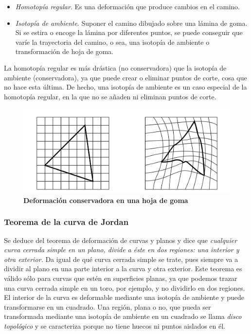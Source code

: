 \begin{itemize}
\item \textit{Homotopía regular}. Es una deformación que produce cambios en el camino.
\item \textit{Isotopía de ambiente}. Suponer el camino dibujado sobre una lámina de goma. Si se estira o encoge la lámina por diferentes puntos, se puede conseguir que varíe la trayectoria del camino, o sea, una isotopía de ambiente o transformación de hoja de goma.
\end{itemize}

La homotopía regular es más drástica (no conservadora) que la isotopía de ambiente (conservadora), ya que puede crear o eliminar puntos de corte, cosa que no hace esta última. De hecho, una isotopía de ambiente es un caso especial de la homotopía regular, en la que no se añaden ni eliminan puntos de corte.


\begin{figure}[h]
\includegraphics[width=14cm]{Img/GEO/geo-goma.jpg}
\centering
\caption{\textbf{\footnotesize{Deformación conservadora en una hoja de goma}}}
\end{figure}


\subsubsection{Teorema de la curva de Jordan }
Se deduce del teorema de deformación de curvas y planos y dice que \textit{cualquier curva cerrada simple en un plano, divide a éste en dos regiones: una interior y otra exterior.} Da igual de qué curva cerrada simple se trate, pues siempre va a dividir al plano en una
parte interior a la curva y otra exterior. Este teorema es válido sólo para curvas que estén en superficies planas, ya que podemos trazar una curva cerrada simple en un toro, por ejemplo, y no dividirlo en dos regiones.
El interior de la curva es deformable mediante una isotopía de ambiente y puede
transformarse en un cuadrado. Una región, plana o no, que pueda ser transformada mediante una isotopía de ambiente en un cuadrado se llama \textit{disco topológico} y se caracteriza porque no tiene huecos ni puntos aislados en él.

